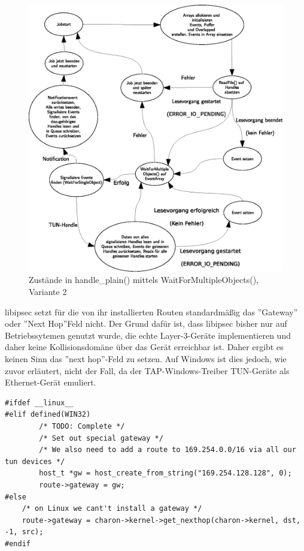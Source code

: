 \begin{figure}
\label{fig:WaitForMultipleObjects2}
\centering
\def\svgwidth{\columnwidth}
\includegraphics[width=\textwidth]{WaitForMultipleObjects2.eps}
\caption{Zustände in handle\_plain() mittels WaitForMultipleObjects(), Variante 2}
\end{figure}

libipsec setzt für die von ihr installierten Routen standardmäßig das ''Gateway''
oder ''Next Hop''Feld nicht. Der Grund dafür ist, dass libipsec bisher nur auf
Betriebssytemen genutzt wurde, die echte Layer-3-Geräte implementieren und
daher keine Kollisionsdomäne über das Gerät erreichbar ist. Daher ergibt es keinen
Sinn das ''next hop''-Feld zu setzen.
Auf Windows ist dies jedoch, wie zuvor erläutert, nicht der Fall, da der TAP-Windows-Treiber
TUN-Geräte als Ethernet-Gerät emuliert.
\begin{lstlisting}[caption=Patch für die Routen-Installation von libipsec]
#ifdef __linux__
#elif defined(WIN32)
        /* TODO: Complete */
        /* Set out special gateway */
        /* We also need to add a route to 169.254.0.0/16 via all our tun devices */
        host_t *gw = host_create_from_string("169.254.128.128", 0);
        route->gateway = gw;
#else
	/* on Linux we cant't install a gateway */
	route->gateway = charon->kernel->get_nexthop(charon->kernel, dst, -1, src);
#endif
\end{lstlisting}
